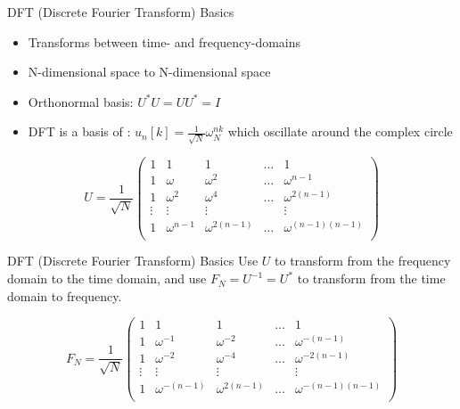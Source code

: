 \begin{frame}{DFT (Discrete Fourier Transform) Basics}
  \begin{itemize}
    \item Transforms between time- and frequency-domains
    \item N-dimensional space to N-dimensional space
    \item Orthonormal basis: $U^*U = UU^* = I$
    \item DFT is a basis of : $u_n[k] = \frac{1}{\sqrt{N}} \omega_N^{nk} $ which oscillate around the complex circle
  \end{itemize}
  \begin{equation*}
    U = \frac{1}{\sqrt{N}}
    \begin{pmatrix}
      1 & 1 & 1 & \ldots & 1 \\
      1 & \omega & \omega^2 & \ldots & \omega^{n-1} \\
      1 & \omega^2 & \omega^4 & \ldots  & \omega^{2(n-1)} \\
      \vdots & \vdots & \vdots & & \vdots \\
      1 & \omega^{n-1} & \omega^{2(n-1)} & \ldots & \omega^{(n-1)(n-1)} \\
    \end{pmatrix}
  \end{equation*}
\end{frame}

\begin{frame}{DFT (Discrete Fourier Transform) Basics}
  Use $U$ to transform from the frequency domain to the time domain, and use
  $F_N = U^{-1} = U^*$ to transform from the time domain to frequency.

  \begin{equation*}
    F_N = \frac{1}{\sqrt{N}}
    \begin{pmatrix}
      1 & 1 & 1 & \ldots & 1 \\
      1 & \omega^{-1} & \omega^{-2} & \ldots & \omega^{-(n-1)} \\
      1 & \omega^{-2} & \omega^{-4} & \ldots  & \omega^{-2(n-1)} \\
      \vdots & \vdots & \vdots & & \vdots \\
      1 & \omega^{-(n-1)} & \omega^{2(n-1)} & \ldots & \omega^{-(n-1)(n-1)} \\
    \end{pmatrix}
  \end{equation*}
\end{frame}

